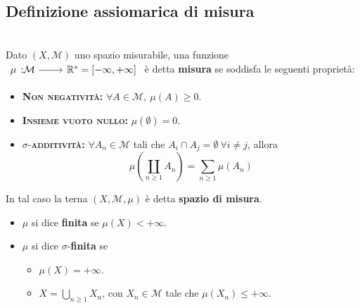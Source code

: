 \subsection{Definizione assiomarica di misura}
\begin{define}~{}\\
	Dato $\left(X,\mathcal{M}\right)$ uno spazio misurabile, una funzione $\funz{\mu}{\mathcal{M}}{\realset^{\ast}=\left[-\infty,+\infty\right]}$ è detta \textbf{misura} se soddisfa le seguenti proprietà:
	\begin{itemize}
		\item \textsc{\textbf{Non negatività:}} $\forall A\in\mathcal{M},\ \mu\left(A\right)\geq 0$.
		\item \textsc{\textbf{Insieme vuoto nullo:}} $\mu\left(\emptyset\right)=0$.
		\item $\sigma$-\textsc{\textbf{additività:}} $\forall A_n\in\mathcal{M}$ tali che $A_i\cap A_j=\emptyset\ \forall i\neq j$, allora
		\begin{equation}
			\mu\left(\coprod_{n\geq 1}A_n\right)=\sum_{n\geq 1}\mu\left(A_n\right)
		\end{equation}
	\end{itemize}
	In tal caso la terna $\left(X,\mathcal{M},\mu\right)$ è detta \textbf{spazio di misura}.
	\begin{itemize}
		\item $\mu$ si dice \textbf{finita} se $\mu\left(X\right)<+\infty$.
		\item $\mu$ si dice $\sigma$-\textbf{finita} se
		\begin{itemize}
			\item $\mu\left(X\right)=+\infty$.
			\item $\displaystyle X=\bigcup_{n\geq 1}X_n$, con $X_n\in\mathcal{M}$ tale che $\mu\left(X_n\right)\leq +\infty$.
		\end{itemize}
	\end{itemize}
\end{define}
